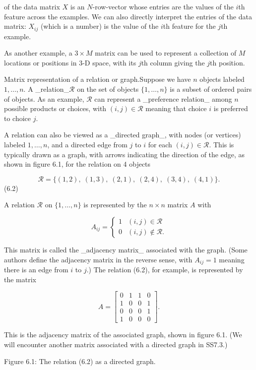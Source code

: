 of the data matrix \(X\) is an \(N\)-row-vector whose entries are the values of the \(i\)th feature across the examples. We can also directly interpret the entries of the data matrix: \(X_{ij}\) (which is a number) is the value of the \(i\)th feature for the \(j\)th example.

As another example, a \(3\times M\) matrix can be used to represent a collection of \(M\) locations or positions in 3-D space, with its \(j\)th column giving the \(j\)th position.

Matrix representation of a relation or graph.Suppose we have \(n\) objects labeled \(1,\ldots,n\). A _relation_\(\mathcal{R}\) on the set of objects \(\{1,\ldots,n\}\) is a subset of ordered pairs of objects. As an example, \(\mathcal{R}\) can represent a _preference relation_ among \(n\) possible products or choices, with \((i,j)\in\mathcal{R}\) meaning that choice \(i\) is preferred to choice \(j\).

A relation can also be viewed as a _directed graph_, with nodes (or vertices) labeled \(1,\ldots,n\), and a directed edge from \(j\) to \(i\) for each \((i,j)\in\mathcal{R}\). This is typically drawn as a graph, with arrows indicating the direction of the edge, as shown in figure 6.1, for the relation on 4 objects

\[\mathcal{R}=\{(1,2),\;(1,3),\;(2,1),\;(2,4),\;(3,4),\;(4,1)\}.\] (6.2)

A relation \(\mathcal{R}\) on \(\{1,\ldots,n\}\) is represented by the \(n\times n\) matrix \(A\) with

\[A_{ij}=\left\{\begin{array}{ll}1&(i,j)\in\mathcal{R}\\ 0&(i,j)\not\in\mathcal{R}.\end{array}\right.\]

This matrix is called the _adjacency matrix_ associated with the graph. (Some authors define the adjacency matrix in the reverse sense, with \(A_{ij}=1\) meaning there is an edge from \(i\) to \(j\).) The relation (6.2), for example, is represented by the matrix

\[A=\left[\begin{array}{cccc}0&1&1&0\\ 1&0&0&1\\ 0&0&0&1\\ 1&0&0&0\end{array}\right].\]

This is the adjacency matrix of the associated graph, shown in figure 6.1. (We will encounter another matrix associated with a directed graph in SS7.3.)

Figure 6.1: The relation (6.2) as a directed graph.

 